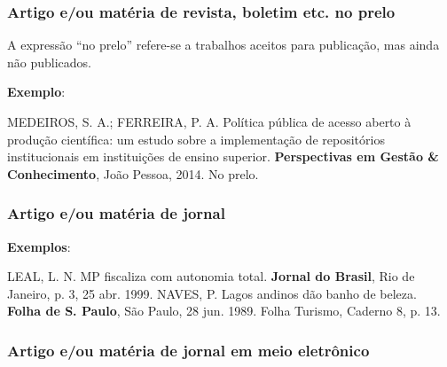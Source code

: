 \subsubsection{Artigo e/ou matéria de revista, boletim etc. no prelo}

A expressão ``no prelo'' refere-se a trabalhos aceitos para publicação, mas ainda não publicados.

\begin{exemplomanual}
\textbf{Exemplo}:\\
\begin{singlespace}
MEDEIROS, S. A.; FERREIRA, P. A. Política pública de acesso aberto à produção científica: um estudo sobre a implementação de repositórios institucionais em instituições de ensino superior. \textbf{Perspectivas em Gestão \& Conhecimento}, João Pessoa, 2014. No prelo.
\end{singlespace}
\end{exemplomanual}


\subsubsection{Artigo e/ou matéria de jornal}

\begin{flushleft}
\begin{singlespace}
\end{singlespace}
\end{flushleft}

\begin{exemplomanual}
\textbf{Exemplos}:\\
\begin{singlespace}
LEAL, L. N. MP fiscaliza com autonomia total. \textbf{Jornal do Brasil}, Rio de Janeiro, p. 3, 25 abr. 1999.
\newline
\newline
NAVES, P. Lagos andinos dão banho de beleza. \textbf{Folha de S. Paulo}, São Paulo, 28 jun. 1989. Folha Turismo, Caderno 8, p. 13.
\end{singlespace}
\end{exemplomanual}


\subsubsection{Artigo e/ou matéria de jornal em meio eletrônico}

